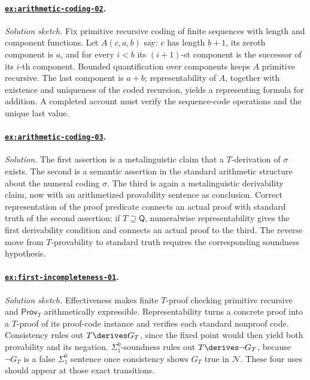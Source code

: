\paragraph{\hyperref[ex:arithmetic-coding-02]{\texttt{ex:arithmetic-coding-02}}.}
\textit{Solution sketch.}  Fix primitive recursive coding of finite sequences
with length and component functions.  Let \(A(c,a,b)\) say: \(c\) has length
\(b+1\), its zeroth component is \(a\), and for every \(i<b\) its
\((i+1)\)-st component is the successor of its \(i\)-th component.  Bounded
quantification over components keeps \(A\) primitive recursive.  The last
component is \(a+b\); representability of \(A\), together with existence and
uniqueness of the coded recursion, yields a representing formula for addition.
A completed account must verify the sequence-code operations and the unique
last value.

\paragraph{\hyperref[ex:arithmetic-coding-03]{\texttt{ex:arithmetic-coding-03}}.}
\textit{Solution.}  The first assertion is a metalinguistic claim that a
\(T\)-derivation of \(\sigma\) exists.  The second is a semantic assertion in
the standard arithmetic structure about the numeral coding \(\sigma\).  The
third is again a metalinguistic derivability claim, now with an arithmetized
provability sentence as conclusion.  Correct representation of the proof
predicate connects an actual proof with standard truth of the second assertion;
if \(T\supseteq\mathsf Q\), numeralwise representability gives the first
derivability condition and connects an actual proof to the third.  The reverse
move from \(T\)-provability to standard truth requires the corresponding
soundness hypothesis.

\paragraph{\hyperref[ex:first-incompleteness-01]{\texttt{ex:first-incompleteness-01}}.}
\textit{Solution sketch.}  Effectiveness makes finite \(T\)-proof checking
primitive recursive and \(\mathsf{Prov}_T\) arithmetically expressible.
Representability turns a concrete proof into a \(T\)-proof of its proof-code
instance and verifies each standard nonproof code.  Consistency rules out
\(T\derives G_T\), since the fixed point would then yield both provability and
its negation.  \(\Sigma^0_1\)-soundness rules out
\(T\derives\neg G_T\), because \(\neg G_T\) is a false
\(\Sigma^0_1\) sentence once consistency shows \(G_T\) true in
\(\mathcal N\).  These four uses should appear at those exact transitions.

